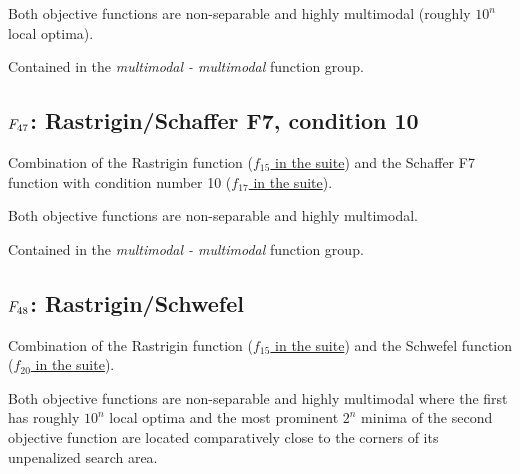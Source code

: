 Both objective functions are non-separable and highly multimodal
(roughly \(10^n\) local optima).

Contained in the \emph{multimodal - multimodal} function group.



\subsection[\texorpdfstring{\protect\(F_{47}\protect\): Rastrigin/Schaffer F7, condition 10}{F47: Rastrigin/Schaffer F7, condition 10}]{\texorpdfstring{\protect\(F_{47}\protect\): Rastrigin/Schaffer F7, condition 10}{}}
\label{index:rastrigin-schaffer-f7-condition-10}\label{index:f47}
Combination of the Rastrigin function
(\href{https://coco.gforge.inria.fr/downloads/download16.00/bbobdocfunctions.pdf\#page=75}{\(f_{15}\) in the \bbob suite}) and the Schaffer F7 function with
condition number 10 (\href{https://coco.gforge.inria.fr/downloads/download16.00/bbobdocfunctions.pdf\#page=85}{\(f_{17}\) in the \bbob suite}).

Both objective functions are non-separable and highly multimodal.

Contained in the \emph{multimodal - multimodal} function group.



\subsection[\texorpdfstring{\protect\(F_{48}\protect\): Rastrigin/Schwefel}{F48: Rastrigin/Schwefel}]{\texorpdfstring{\protect\(F_{48}\protect\): Rastrigin/Schwefel}{}}
\label{index:f48}\label{index:rastrigin-schwefel}
Combination of the Rastrigin function
(\href{https://coco.gforge.inria.fr/downloads/download16.00/bbobdocfunctions.pdf\#page=75}{\(f_{15}\) in the \bbob suite}) and the Schwefel function (\href{https://coco.gforge.inria.fr/downloads/download16.00/bbobdocfunctions.pdf\#page=100}{\(f_{20}\) in the \bbob suite}).

Both objective functions are non-separable and highly multimodal where
the first has roughly \(10^n\) local optima and the most prominent
\(2^n\) minima of the second objective function are located
comparatively close to the corners of its unpenalized search area.

